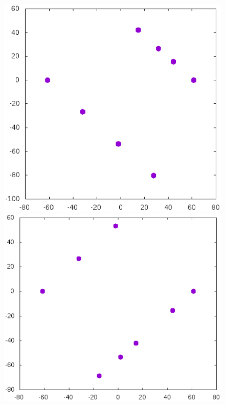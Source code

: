 \documentclass[12pt]{article}
\begin{document}
\begin{itemize}
\begin{figure}[htbp]
	\hfill
	\\
	\parbox{.48\linewidth}{\caption{}\label{}}
	\hfill
	\parbox{.48\linewidth}{\caption{}\label{}}
\end{figure}



\begin{figure}[htbp]
	\includegraphics[width=.48\linewidth]{Avdeev_8_123_1538485378899.eps}
	\hfill
	\includegraphics[width=.48\linewidth]{Avdeev_8_123_1538485378698.eps}
	\\
	\parbox{.48\linewidth}{\caption{}\label{Avdeev_8_123_1538485378899.eps}}
	\hfill
	\parbox{.48\linewidth}{\caption{}\label{Avdeev_8_123_1538485378698.eps}}
\end{figure}




\end{itemize}
\end{document}
